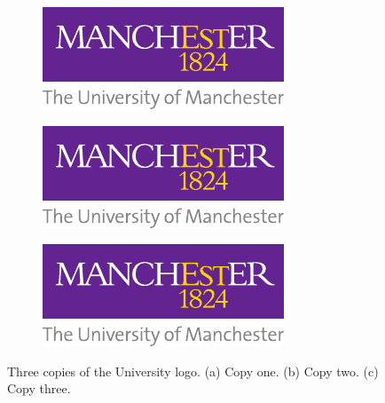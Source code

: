     \begin{figure}
      \centering
      \begin{subfigure}{0.3\linewidth}
        \includegraphics[alt={Put short description for screen readers here},width=\textwidth,keepaspectratio=true]{uom_logo.pdf}
        \caption{}
        \label{fig:subfig_a}
      \end{subfigure}
      \begin{subfigure}{0.3\linewidth}
        \includegraphics[alt={Put short description for screen readers here},width=\textwidth,keepaspectratio=true]{uom_logo.pdf}
        \caption{}
        \label{fig:subfig_b}
      \end{subfigure}
      \begin{subfigure}{0.3\linewidth}
        \includegraphics[alt={Put short description for screen readers here},width=\textwidth,keepaspectratio=true]{uom_logo.pdf}
        \caption{}
        \label{fig:subfig_c}
     \end{subfigure}
     \caption{Three copies of the University logo. (a) Copy one. (b) Copy two. (c) Copy three.}
     \label{fig:uom_logo_in_subfig}
    \end{figure}

